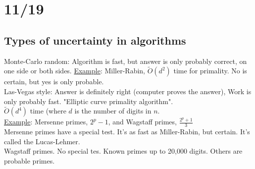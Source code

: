 \documentclass[13pt]{article}
\begin{document}
\section*{11/19}
	\subsection*{Types of uncertainty in algorithms}
		Monte-Carlo random: Algorithm is fast, but answer is only probably
		correct, on one side or both sides. 
		\underline{Example}: Miller-Rabin, $\tilde{O}(d^2)$ time for primality.
		No is certain, but yes is only probable.\\
		Las-Vegas style: Answer is definitely right (computer proves the answer),
		Work is only probably fast. "Elliptic curve primality algorithm".\\
		$\tilde{O}(d^4)$ time (where $d$ is the number of digits in $n$.\\
		\underline{Example}: Mersenne primes, $2^p -1$, and Wagstaff primes,
		$\frac{2^p + 1}{3}$\\
		Mersenne primes have a special test. It's as fast as Miller-Rabin, but
		certain. It's called the Lucas-Lehmer.\\
		Wagstaff primes. No special tes. Known primes up to 20,000 digits. Others
		are probable primes.\\
\end{document}
